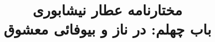 \documentclass[14pt,b5paper]{article}
\begin{document}
\title{\Huge مختارنامه عطار نیشابوری \\
باب چهلم: در ناز و بیوفائی معشوق}
\author{ }
\date{ }
\maketitle
\newpage
\tableofcontents
\newpage

\newpage

\newpage

\newpage

\newpage

\newpage

\newpage

\newpage

\newpage

\newpage

\newpage

\newpage

\newpage

\newpage

\newpage

\newpage

\newpage

\newpage

\newpage

\newpage

\newpage

\newpage

\newpage

\newpage

\newpage

\newpage

\newpage

\newpage

\newpage

\newpage

\newpage
\end{document}
